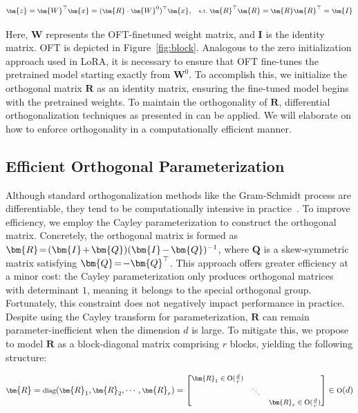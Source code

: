 \begin{equation}\label{eq:oft_general}
    \footnotesize
    \bm{z}=\bm{W}^\top\bm{x}=(\bm{R}\cdot\bm{W}^0)^\top\bm{x},~~~\text{s.t.}~\bm{R}^\top\bm{R}=\bm{R}\bm{R}^\top=\bm{I}
\end{equation}

Here, $\bm{W}$ represents the OFT-finetuned weight matrix, and $\bm{I}$ is the identity matrix. OFT is depicted in Figure~\ref{fig:block}. Analogous to the zero initialization approach used in LoRA, it is necessary to ensure that OFT fine-tunes the pretrained model starting exactly from $\bm{W}^0$. To accomplish this, we initialize the orthogonal matrix $\bm{R}$ as an identity matrix, ensuring the fine-tuned model begins with the pretrained weights. To maintain the orthogonality of $\bm{R}$, differential orthogonalization techniques as presented in \cite{liu2021orthogonal,lezcano2019cheap} can be applied. We will elaborate on how to enforce orthogonality in a computationally efficient manner.

\subsection{Efficient Orthogonal Parameterization}\label{sect:eff_ortho}

Although standard orthogonalization methods like the Gram-Schmidt process are differentiable, they tend to be computationally intensive in practice~\cite{liu2021orthogonal}. To improve efficiency, we employ the Cayley parameterization to construct the orthogonal matrix. Concretely, the orthogonal matrix is formed as $\thickmuskip=2mu \medmuskip=2mu \bm{R}=(\bm{I}+\bm{Q})(\bm{I}-\bm{Q})^{-1}$, where $\bm{Q}$ is a skew-symmetric matrix satisfying $\thickmuskip=2mu \medmuskip=2mu \bm{Q}=-\bm{Q}^\top$. This approach offers greater efficiency at a minor cost: the Cayley parameterization only produces orthogonal matrices with determinant $1$, meaning it belongs to the special orthogonal group. Fortunately, this constraint does not negatively impact performance in practice. Despite using the Cayley transform for parameterization, $\bm{R}$ can remain parameter-inefficient when the dimension $d$ is large. To mitigate this, we propose to model $\bm{R}$ as a block-diagonal matrix comprising $r$ blocks, yielding the following structure:

\begin{equation}
    \footnotesize
    \bm{R}=\text{diag}(\bm{R}_1,\bm{R}_2,\cdots,\bm{R}_r)=\begin{bmatrix}
    \bm{R}_1\in \text{O}(\frac{d}{r}) &  &\\
    &\ddots & \\
    & & \bm{R}_r\in \text{O}(\frac{d}{r})
    \end{bmatrix}\in \text{O}(d)
\end{equation}

